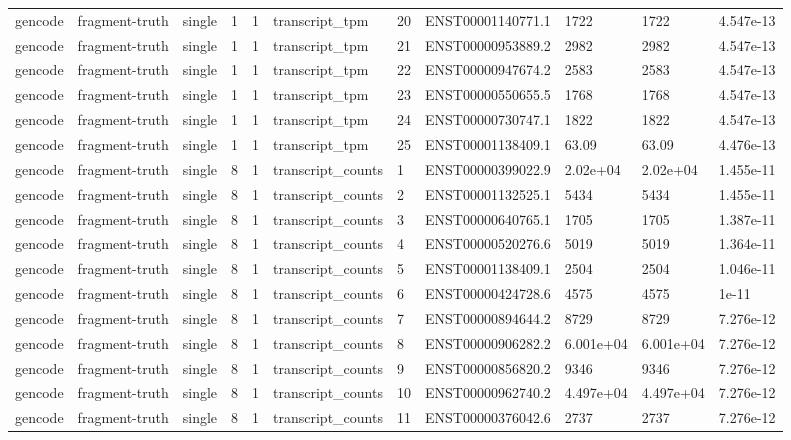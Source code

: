 \begin{tabular}{lllllllllll}
gencode & fragment-truth & single & 1 & 1 & transcript\_tpm & 20 & ENST00001140771.1 & 1722 & 1722 & 4.547e-13 \\
gencode & fragment-truth & single & 1 & 1 & transcript\_tpm & 21 & ENST00000953889.2 & 2982 & 2982 & 4.547e-13 \\
gencode & fragment-truth & single & 1 & 1 & transcript\_tpm & 22 & ENST00000947674.2 & 2583 & 2583 & 4.547e-13 \\
gencode & fragment-truth & single & 1 & 1 & transcript\_tpm & 23 & ENST00000550655.5 & 1768 & 1768 & 4.547e-13 \\
gencode & fragment-truth & single & 1 & 1 & transcript\_tpm & 24 & ENST00000730747.1 & 1822 & 1822 & 4.547e-13 \\
gencode & fragment-truth & single & 1 & 1 & transcript\_tpm & 25 & ENST00001138409.1 & 63.09 & 63.09 & 4.476e-13 \\
gencode & fragment-truth & single & 8 & 1 & transcript\_counts & 1 & ENST00000399022.9 & 2.02e+04 & 2.02e+04 & 1.455e-11 \\
gencode & fragment-truth & single & 8 & 1 & transcript\_counts & 2 & ENST00001132525.1 & 5434 & 5434 & 1.455e-11 \\
gencode & fragment-truth & single & 8 & 1 & transcript\_counts & 3 & ENST00000640765.1 & 1705 & 1705 & 1.387e-11 \\
gencode & fragment-truth & single & 8 & 1 & transcript\_counts & 4 & ENST00000520276.6 & 5019 & 5019 & 1.364e-11 \\
gencode & fragment-truth & single & 8 & 1 & transcript\_counts & 5 & ENST00001138409.1 & 2504 & 2504 & 1.046e-11 \\
gencode & fragment-truth & single & 8 & 1 & transcript\_counts & 6 & ENST00000424728.6 & 4575 & 4575 & 1e-11 \\
gencode & fragment-truth & single & 8 & 1 & transcript\_counts & 7 & ENST00000894644.2 & 8729 & 8729 & 7.276e-12 \\
gencode & fragment-truth & single & 8 & 1 & transcript\_counts & 8 & ENST00000906282.2 & 6.001e+04 & 6.001e+04 & 7.276e-12 \\
gencode & fragment-truth & single & 8 & 1 & transcript\_counts & 9 & ENST00000856820.2 & 9346 & 9346 & 7.276e-12 \\
gencode & fragment-truth & single & 8 & 1 & transcript\_counts & 10 & ENST00000962740.2 & 4.497e+04 & 4.497e+04 & 7.276e-12 \\
gencode & fragment-truth & single & 8 & 1 & transcript\_counts & 11 & ENST00000376042.6 & 2737 & 2737 & 7.276e-12 \\

\end{tabular}
